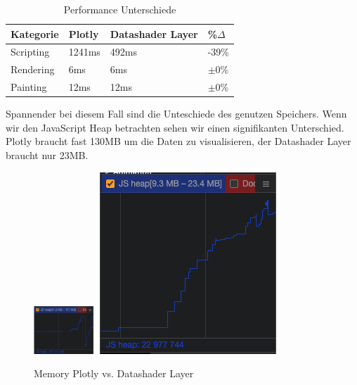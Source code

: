 \documentclass{article}
\begin{document}
\begin{table}[!h]
    \centering
    \begin{tabular}{|l|l|l|l|}
    \hline
    \textbf{Kategorie} & \textbf{Plotly} & \textbf{Datashader Layer} & \textbf{\%$\Delta$} \\
    \hline
    Scripting & 1241ms & 492ms & -39\% \\
    \hline
    Rendering & 6ms & 6ms & $\pm$0\% \\
    \hline
    Painting & 12ms & 12ms & $\pm$0\% \\
    \hline
    \end{tabular}
    \caption{\label{tab: LE1 Performance}Performance Unterschiede}
    \end{table}

Spannender bei diesem Fall sind die Unteschiede des genutzen Speichers. Wenn wir den JavaScript Heap betrachten sehen wir einen signifikanten Unterschied.
Plotly braucht fast 130MB um die Daten zu visualisieren, der Datashader Layer braucht nur 23MB.

\begin{figure}[!h]
\centering
\includegraphics[width=0.2\textwidth]{img/js_heap_plotly.png}
\includegraphics[height=0.158\textwidth]{img/js_heap_datashader.png}
\caption{\label{fig: LE1 Datashader Memory} Memory Plotly vs. Datashader Layer}
\end{figure}



\newpage
\printbibliography
\end{document}
